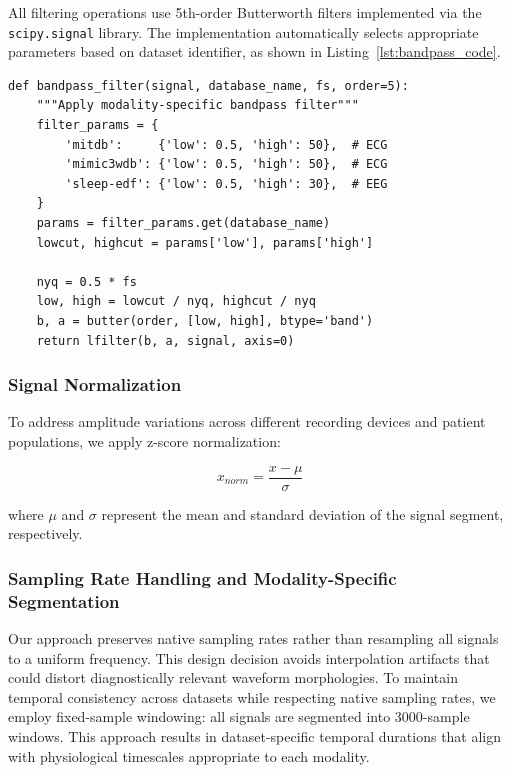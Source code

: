 \documentclass[conference]{IEEEtran}
\begin{document}
All filtering operations use 5th-order Butterworth filters implemented via the \texttt{scipy.signal} library. The implementation automatically selects appropriate parameters based on dataset identifier, as shown in Listing~\ref{lst:bandpass_code}.

\begin{lstlisting}[caption={Modality-Adaptive Bandpass Filtering Implementation}, label=lst:bandpass_code]
def bandpass_filter(signal, database_name, fs, order=5):
    """Apply modality-specific bandpass filter"""
    filter_params = {
        'mitdb':     {'low': 0.5, 'high': 50},  # ECG
        'mimic3wdb': {'low': 0.5, 'high': 50},  # ECG
        'sleep-edf': {'low': 0.5, 'high': 30},  # EEG
    }
    params = filter_params.get(database_name)
    lowcut, highcut = params['low'], params['high']

    nyq = 0.5 * fs
    low, high = lowcut / nyq, highcut / nyq
    b, a = butter(order, [low, high], btype='band')
    return lfilter(b, a, signal, axis=0)
\end{lstlisting}

\subsubsection{Signal Normalization}
To address amplitude variations across different recording devices and patient populations, we apply z-score normalization:

\begin{equation}
x_{norm} = \frac{x - \mu}{\sigma}
\label{eq:normalization}
\end{equation}

where $\mu$ and $\sigma$ represent the mean and standard deviation of the signal segment, respectively.

\subsubsection{Sampling Rate Handling and Modality-Specific Segmentation}

Our approach preserves native sampling rates rather than resampling all signals to a uniform frequency. This design decision avoids interpolation artifacts that could distort diagnostically relevant waveform morphologies. To maintain temporal consistency across datasets while respecting native sampling rates, we employ fixed-sample windowing: all signals are segmented into 3000-sample windows. This approach results in dataset-specific temporal durations that align with physiological timescales appropriate to each modality.
\end{document}
